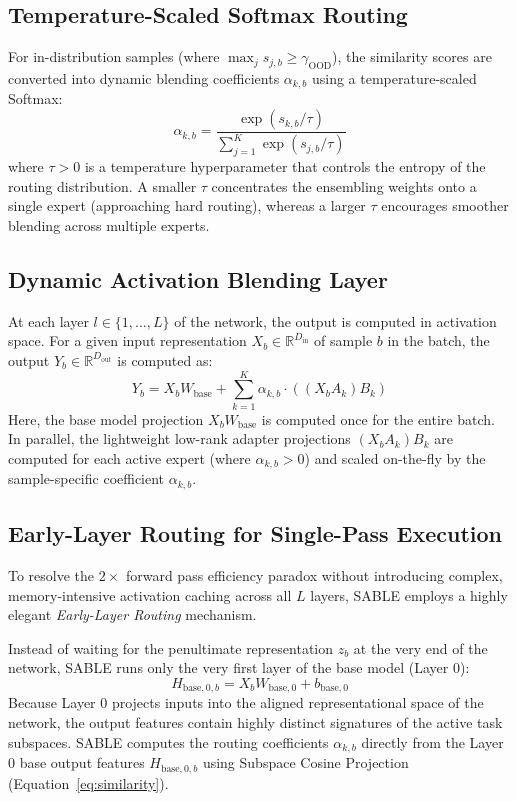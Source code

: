\subsection{Temperature-Scaled Softmax Routing}
For in-distribution samples (where $\max_j s_{j, b} \ge \gamma_{\text{OOD}}$), the similarity scores are converted into dynamic blending coefficients $\alpha_{k, b}$ using a temperature-scaled Softmax:
\begin{equation}
\alpha_{k, b} = \frac{\exp(s_{k, b} / \tau)}{\sum_{j=1}^K \exp(s_{j, b} / \tau)}
\label{eq:softmax}
\end{equation}
where $\tau > 0$ is a temperature hyperparameter that controls the entropy of the routing distribution. A smaller $\tau$ concentrates the ensembling weights onto a single expert (approaching hard routing), whereas a larger $\tau$ encourages smoother blending across multiple experts.

\subsection{Dynamic Activation Blending Layer}
At each layer $l \in \{1, \dots, L\}$ of the network, the output is computed in activation space. For a given input representation $X_b \in \mathbb{R}^{D_{\text{in}}}$ of sample $b$ in the batch, the output $Y_b \in \mathbb{R}^{D_{\text{out}}}$ is computed as:
\begin{equation}
Y_b = X_b W_{\text{base}} + \sum_{k=1}^K \alpha_{k, b} \cdot \left( (X_b A_k) B_k \right)
\label{eq:blending}
\end{equation}
Here, the base model projection $X_b W_{\text{base}}$ is computed once for the entire batch. In parallel, the lightweight low-rank adapter projections $(X_b A_k) B_k$ are computed for each active expert (where $\alpha_{k, b} > 0$) and scaled on-the-fly by the sample-specific coefficient $\alpha_{k, b}$.

\subsection{Early-Layer Routing for Single-Pass Execution}
To resolve the $2\times$ forward pass efficiency paradox without introducing complex, memory-intensive activation caching across all $L$ layers, SABLE employs a highly elegant \emph{Early-Layer Routing} mechanism. 

Instead of waiting for the penultimate representation $z_b$ at the very end of the network, SABLE runs only the very first layer of the base model (Layer 0):
\begin{equation}
H_{\text{base}, 0, b} = X_b W_{\text{base}, 0} + b_{\text{base}, 0}
\label{eq:layer0_base}
\end{equation}
Because Layer 0 projects inputs into the aligned representational space of the network, the output features contain highly distinct signatures of the active task subspaces. SABLE computes the routing coefficients $\alpha_{k, b}$ directly from the Layer 0 base output features $H_{\text{base}, 0, b}$ using Subspace Cosine Projection (Equation~\ref{eq:similarity}).

